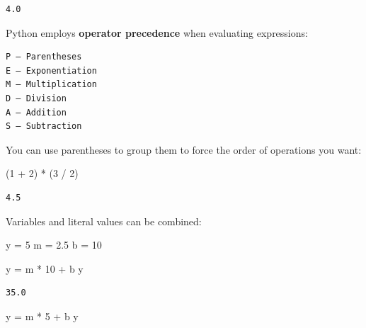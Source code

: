 \documentclass[
  letterpaper,
  DIV=11,
  numbers=noendperiod]{scrreprt}
\newenvironment{Shaded}{\begin{snugshade}}{\end{snugshade}}
\newcommand{\DecValTok}[1]{\textcolor[rgb]{0.68,0.00,0.00}{#1}}
\newcommand{\FloatTok}[1]{\textcolor[rgb]{0.68,0.00,0.00}{#1}}
\newcommand{\NormalTok}[1]{\textcolor[rgb]{0.00,0.23,0.31}{#1}}
\newcommand{\OperatorTok}[1]{\textcolor[rgb]{0.37,0.37,0.37}{#1}}
\begin{document}
\begin{verbatim}
4.0
\end{verbatim}

Python employs \textbf{operator precedence} when evaluating expressions:

\begin{verbatim}
P – Parentheses
E – Exponentiation
M – Multiplication
D – Division
A – Addition
S – Subtraction
\end{verbatim}

You can use parentheses to group them to force the order of operations
you want:

\begin{Shaded}
\begin{Highlighting}[]
\NormalTok{(}\DecValTok{1} \OperatorTok{+} \DecValTok{2}\NormalTok{) }\OperatorTok{*}\NormalTok{ (}\DecValTok{3} \OperatorTok{/} \DecValTok{2}\NormalTok{)}
\end{Highlighting}
\end{Shaded}

\begin{verbatim}
4.5
\end{verbatim}

Variables and literal values can be combined:

\begin{Shaded}
\begin{Highlighting}[]
\NormalTok{y }\OperatorTok{=} \DecValTok{5}
\NormalTok{m }\OperatorTok{=} \FloatTok{2.5}
\NormalTok{b }\OperatorTok{=} \DecValTok{10}
\end{Highlighting}
\end{Shaded}

\begin{Shaded}
\begin{Highlighting}[]
\NormalTok{y }\OperatorTok{=}\NormalTok{ m }\OperatorTok{*} \DecValTok{10} \OperatorTok{+}\NormalTok{ b}
\NormalTok{y}
\end{Highlighting}
\end{Shaded}

\begin{verbatim}
35.0
\end{verbatim}

\begin{Shaded}
\begin{Highlighting}[]
\NormalTok{y }\OperatorTok{=}\NormalTok{ m }\OperatorTok{*} \DecValTok{5} \OperatorTok{+}\NormalTok{ b}
\NormalTok{y}
\end{Highlighting}
\end{Shaded}
\end{document}
